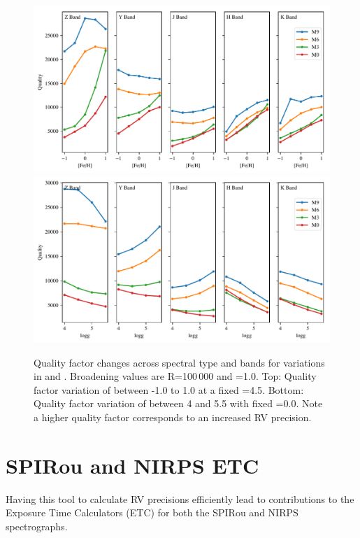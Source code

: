 \begin{figure}
    \includegraphics[width=0.99\linewidth]{figures/information-content/metalicity_effect.pdf}\\
    \includegraphics[width=0.99\linewidth]{figures/information-content/logg_effect.pdf}
    \caption[Quality factor verse \feh{} and \Logg{} for different spectral types and wavelength bands.]{Quality factor changes across spectral type and bands for variations in \feh{} and \Logg{}.
        Broadening values are R=100\,000 and \Vsini{}=1.0\kmps{}.
        Top: Quality factor variation of \feh{} between -1.0 to 1.0 at a fixed \Logg{}=4.5.
        Bottom: Quality factor variation of \Logg{} between 4 and 5.5 with fixed \feh{}=0.0.
        Note a higher quality factor corresponds to an increased {RV} precision.}
    \label{fig:deviations}
\end{figure}


\clearpage


\section{{SPIRou} and {NIRPS} {ETC}}\label{sec:spirou_nirps_etc}
Having this tool to calculate {RV} precisions efficiently lead to contributions to the Exposure Time Calculators (ETC) for both the {SPIRou} and {NIRPS} spectrographs.


